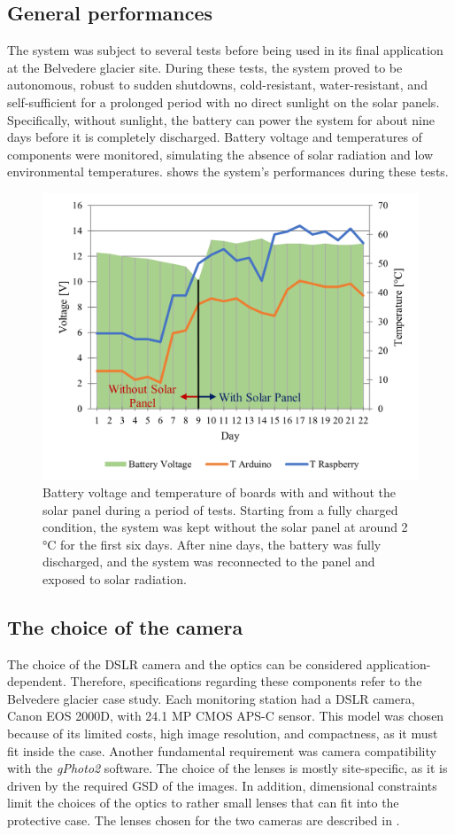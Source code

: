 \subsection{General performances}\label{General_performances}
The system was subject to several tests before being used in its final application at the Belvedere glacier site. During these tests, the system proved to be autonomous, robust to sudden shutdowns, cold-resistant, water-resistant, and self-sufficient for a prolonged period with no direct sunlight on the solar panels. 
Specifically, without sunlight, the battery can power the system for about nine days before it is completely discharged. 
Battery voltage and temperatures of components were monitored, simulating the absence of solar radiation and low environmental temperatures.
 shows the system's performances during these tests.

\begin{figure}[ht!]
  \centering
  \includegraphics[width=.6\textwidth]{nominal.png}
  \caption{Battery voltage and temperature of boards with and without the solar panel during a period of tests. 
  Starting from a fully charged condition, the system was kept without the solar panel at around 2 °C for the first six days.
  After nine days, the battery was fully discharged, and the system was reconnected to the panel and exposed to solar radiation.}
  \label{fig:4:nominal_performance}
\end{figure}

\subsection{The choice of the camera}\label{camera}

The choice of the DSLR camera and the optics can be considered application-dependent.
Therefore, specifications regarding these components refer to the Belvedere glacier case study. 
Each monitoring station had a DSLR camera, Canon EOS 2000D, with 24.1 MP CMOS \mbox{APS-C} sensor. 
This model was chosen because of its limited costs, high image resolution, and compactness, as it must fit inside the case. 
Another fundamental requirement was camera compatibility with the \textit{gPhoto2} software. 
The choice of the lenses is mostly site-specific, as it is driven by the required GSD of the images. 
In addition, dimensional constraints limit the choices of the optics to rather small lenses that can fit into the protective case.
The lenses chosen for the two cameras are described in .

